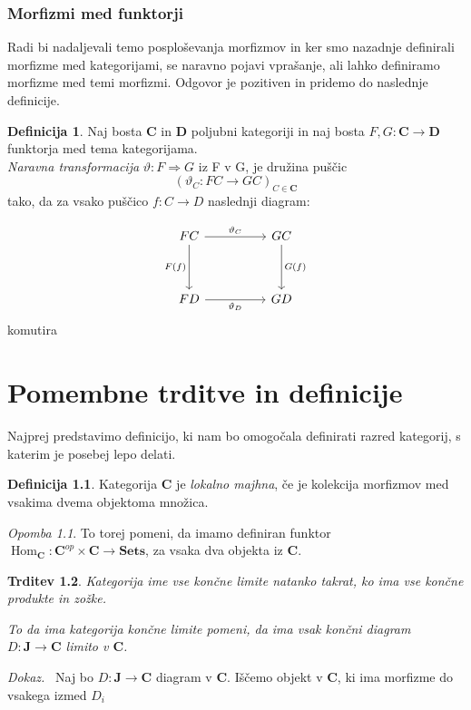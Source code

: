 \documentclass[12pt,a4paper]{book}
\theoremstyle{definition}
\newtheorem{definicija}{Definicija}[chapter]
\theoremstyle{plain}
\newtheorem{trditev}[definicija]{Trditev}
\newenvironment{dokaz}{\emph{Dokaz.}\ }{\hspace{\fill}{$\Box$}}
\theoremstyle{definition}
\theoremstyle{remark}
\newtheorem*{opomba}{Opomba}
\newcommand{\cat}[1]{\textbf{#1}}
\DeclareMathOperator{\Hom}{Hom}
\begin{document}
\subsection{Morfizmi med funktorji}
Radi bi nadaljevali temo posploševanja morfizmov in ker smo nazadnje definirali morfizme med kategorijami, se naravno pojavi vprašanje, ali lahko definiramo morfizme med temi morfizmi. Odgovor je pozitiven in pridemo do naslednje definicije.

\begin{definicija}
Naj bosta $\cat{C}$ in $\cat{D}$ poljubni kategoriji in naj bosta $F,G : \cat{C} \to \cat{D}$ funktorja med tema kategorijama. \\
\textit{Naravna transformacija} $\vartheta : F \Rightarrow G$ iz F v G, je družina puščic 
$$(\vartheta_C : FC \to GC)_{C \in \cat{C}}$$
tako, da za vsako puščico $f : C \to D$ naslednji diagram:

\begin{equation}
\begin{tikzcd}[sep=huge]
FC \arrow[r, "\vartheta_C"] \arrow[d, "F(f)"'] & GC \arrow[d, "G(f)"] \\
FD \arrow[r, "\vartheta_D"'] & GD
\end{tikzcd}
\end{equation}
komutira
\end{definicija}


\chapter{Pomembne trditve in definicije}

Najprej predstavimo definicijo, ki nam bo omogočala definirati razred kategorij, s katerim je posebej lepo delati.
\begin{definicija}
Kategorija $\cat{C}$ je \emph{lokalno majhna}, če je kolekcija morfizmov med vsakima dvema objektoma množica.
\end{definicija}
\begin{opomba}
To torej pomeni, da imamo definiran funktor $\Hom_{\cat{C}} : \cat{C}^{op} \times \cat{C} \to \cat{Sets}$, za vsaka dva objekta iz $\cat{C}$.
\end{opomba}

\begin{trditev}
Kategorija ime vse \textit{končne limite} natanko takrat, ko ima vse končne produkte in zožke.

To da ima kategorija končne limite pomeni, da ima vsak končni diagram $D : \cat{J} \to \cat{C}$ limito v $\cat{C}$.

\end{trditev}
\begin{dokaz}
Naj bo $D : \cat{J} \to \cat{C}$ diagram v $\cat{C}$. Iščemo objekt v $\cat{C}$, ki ima morfizme do vsakega izmed $D_i$ 
\end{dokaz} 
 
\end{document}
